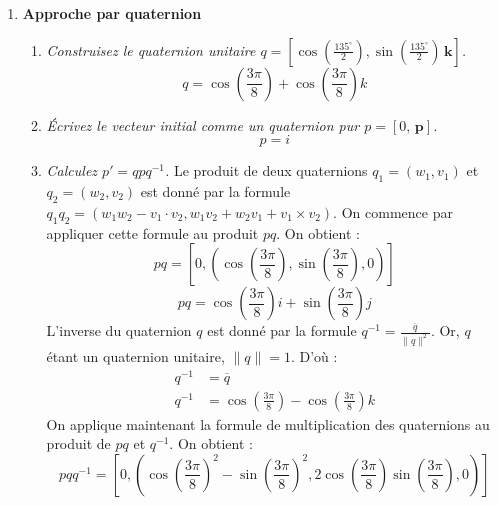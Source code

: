 \documentclass[a4paper,12pt]{article}
\begin{document}
\begin{enumerate}
    \item \textbf{Approche par quaternion}
          \begin{enumerate}
              \item \emph{Construisez le quaternion unitaire $q = \left[\cos\left(\frac{135^\circ}{2}\right), \sin\left(\frac{135^\circ}{2}\right)\,\mathbf{k}\right]$.}
              \begin{equation}
              \boxed{q = \cos(\frac{3 \pi}{8}) + \cos(\frac{3 \pi}{8}) k}
              \end{equation}
              \item \emph{Écrivez le vecteur initial comme un quaternion pur $p = [0,\,\mathbf{p}]$.}
              \begin{equation}
              \boxed{p = i}
              \end{equation}      
              \item \emph{Calculez $p' = q p q^{-1}$.} \newline \newline
              Le produit de deux quaternions \( q_1 = (w_1, v_1) \) et \( q_2 = (w_2, v_2) \) est donné par la formule
              \( q_1 q_2 = (w_1 w_2 − v_1 \cdot v_2, w_1 v_2 + w_2 v_1 + v_1 \times v_2) \). \newline
              On commence par appliquer cette formule au produit \(pq\). On obtient :
              \begin{equation}
              p q = [0, (\cos(\frac{3 \pi}{8}), \sin(\frac{3 \pi}{8}), 0)]
              \end{equation}
              \begin{equation}
              \boxed{p q = \cos(\frac{3 \pi}{8}) i + \sin(\frac{3 \pi}{8}) j}
              \end{equation}
              L'inverse du quaternion \(q\) est donné par la formule \( q^{-1} = \frac{\overline{q}}{\lVert q \rVert^2} \). Or, \(q\) étant un quaternion unitaire, \(\lVert q \rVert = 1\).
              D'où :
              \begin{align}
              q^{-1}  &= \overline{q} \\
              q^{-1}  &=  \cos(\frac{3 \pi}{8}) - \cos(\frac{3 \pi}{8}) k
              \end{align}
              On applique maintenant la formule de multiplication des quaternions au produit de \(p q\) et \(q^{-1}\). On obtient :
              \begin{equation}
              p q q^{-1} = [0, (\cos(\frac{3 \pi}{8})^2 - \sin(\frac{3 \pi}{8})^2, 2 \cos(\frac{3 \pi}{8}) \sin(\frac{3 \pi}{8}), 0)]

\end{equation}
\end{enumerate}
\end{enumerate}
\end{document}

